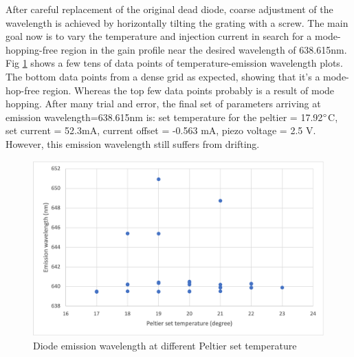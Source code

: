 \documentclass[12pt]{report}
\begin{document}
After careful replacement of the original dead diode, coarse adjustment of the wavelength is achieved by horizontally tilting the grating with a screw. The main goal now is to vary the temperature and injection current in search for a mode-hopping-free region in the gain profile near the desired wavelength of 638.615nm. Fig \ref{fig:diodeLaserEW} shows a few tens of data points of temperature-emission wavelength plots. The bottom data points from a dense grid as expected, showing that it's a mode-hop-free region. Whereas the top few data points probably is a result of mode hopping. After many trial and error, the final set of parameters arriving at emission wavelength=638.615nm is: set temperature for the peltier = 17.92$\degree$C, set current = 52.3mA, current offset = -0.563 mA, piezo voltage = 2.5 V. However, this emission wavelength still suffers from drifting. 

\begin{figure}[H]
    \centering
    \includegraphics{diodeLaserEW.png}
    \caption{Diode emission wavelength at different Peltier set temperature}
    \label{fig:diodeLaserEW}
\end{figure}
\end{document}
